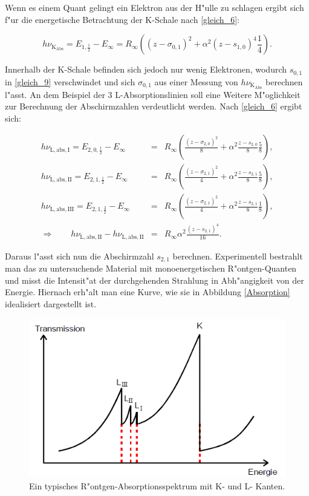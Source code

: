 		Wenn es einem Quant gelingt ein Elektron aus der H"ulle zu schlagen ergibt sich f"ur die energetische Betrachtung der K-Schale nach \eqref{gleich_6}:

		\begin{equation}
			h\nu_{\mathrm{K}_\mathrm{Abs}} = E_{1,\frac{1}{2}} - E_\infty = R_\infty \left( (z - \sigma_{0,1})^2 + \alpha^2 (z-s_{1,0})^4 \frac{1}{4} \right). \label{gleich_11}
		\end{equation}

		Innerhalb der K-Schale befinden sich jedoch nur wenig Elektronen, wodurch $s_{0,1}$ in \eqref{gleich_9} verschwindet und sich $\sigma_{0,1}$ aus einer Messung von $h\nu_{\mathrm{K}_\mathrm{Abs}}$ berechnen l"asst.
		An dem Beispiel der 3 L-Absorptionslinien soll eine Weitere M"oglichkeit zur Berechnung der Abschirmzahlen verdeutlicht werden.
		Nach \eqref{gleich_6} ergibt sich:

		\begin{eqnarray*}
			h \nu_\mathrm{L,abs,I} = E_{2,0,\frac{1}{2}} - E_\infty &=& R_\infty \left( \frac{(z-\sigma_{2,0})^2}{8} + \alpha^2 \frac{z - s_{2,0}}{8} \frac{5}{8} \right),\\
			h \nu_\mathrm{L,abs,II} = E_{2,1,\frac{1}{2}} - E_\infty &=& R_\infty \left( \frac{(z-\sigma_{2,1})^2}{4} + \alpha^2 \frac{z - s_{2,1}}{8} \frac{5}{8} \right),\\
			h \nu_\mathrm{L,abs,III} = E_{2,1,\frac{3}{2}} - E_\infty &=& R_\infty \left( \frac{(z-\sigma_{2,1})^2}{4} + \alpha^2 \frac{z - s_{2,1}}{8} \frac{1}{8} \right),\\
			\Rightarrow \qquad h\nu_\mathrm{L,abs,II} - h\nu_\mathrm{L,abs,II} &=& R_\infty \alpha^2 \frac{(z - s_{2,1})^4}{16}.
		\end{eqnarray*}

		Daraus l"asst sich nun die Abschirmzahl $s_{2,1}$ berechnen.
		Experimentell bestrahlt man das zu untersuchende Material mit monoenergetischen R"ontgen-Quanten und misst die Intensit"at der durchgehenden Strahlung in Abh"angigkeit von der Energie.
		Hiernach erh"alt man eine Kurve, wie sie in Abbildung \eqref{Absorption} idealisiert dargestellt ist.

		\begin{figure}[htbp]
			\centering
			\includegraphics[width = 12cm]{img/absorption.png}
			\caption{Ein typisches R"ontgen-Absorptionsspektrum mit K- und L- Kanten. \cite{anleitung}}
			\label{Absorption}
		\end{figure}

